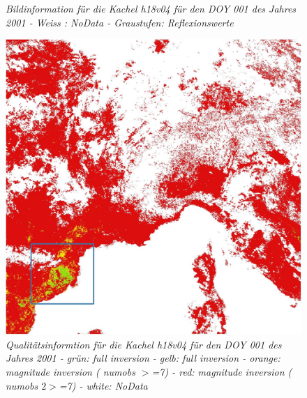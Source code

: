 \documentclass[11pt]{report}
\begin{document}
\begin{figure}[H]
\begin{minipage}[b]{.4\linewidth}
\caption{\textit{Bildinformation für die Kachel h18v04 für den DOY 001 des Jahres 2001 - Weiss : NoData - Graustufen: Reflexionswerte}}
   \end{minipage}
\end{figure}

\begin{figure}[H]
   \begin{minipage}[b]{.4\linewidth} %
      \includegraphics[scale=0.3]{./Grafiken/Fitting/Fitting_durchführung/Fitting_Vergleich_Rohdaten_Qualität_full_1.JPG}
	\caption{\textit{Qualitätsinformtion für die Kachel h18v04 für den DOY 001 des Jahres 2001 - grün: full inversion - gelb: full inversion - orange: magnitude inversion ( numobs $>$=7)  - red: magnitude inversion ( numobs $2>$=7) - white: NoData}}
   \end{minipage}
   \hspace{.1\linewidth}%
   \begin{minipage}[b]{.4\linewidth} %

\end{minipage}
\end{figure}
\end{document}
